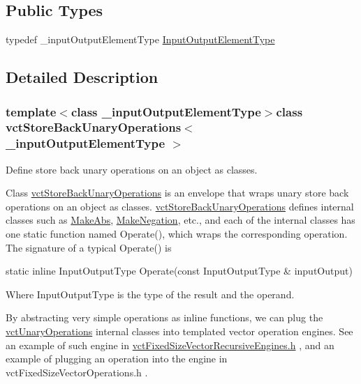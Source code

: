 \subsection*{Public Types}
\begin{DoxyCompactItemize}
\item 
typedef \+\_\+input\+Output\+Element\+Type \hyperlink{classvct_store_back_unary_operations_a8af17faaa73a8d090094d468eee32062}{Input\+Output\+Element\+Type}
\end{DoxyCompactItemize}


\subsection{Detailed Description}
\subsubsection*{template$<$class \+\_\+input\+Output\+Element\+Type$>$class vct\+Store\+Back\+Unary\+Operations$<$ \+\_\+input\+Output\+Element\+Type $>$}

Define store back unary operations on an object as classes. 

Class \hyperlink{classvct_store_back_unary_operations}{vct\+Store\+Back\+Unary\+Operations} is an envelope that wraps unary store back operations on an object as classes. \hyperlink{classvct_store_back_unary_operations}{vct\+Store\+Back\+Unary\+Operations} defines internal classes such as \hyperlink{classvct_store_back_unary_operations_1_1_make_abs}{Make\+Abs}, \hyperlink{classvct_store_back_unary_operations_1_1_make_negation}{Make\+Negation}, etc., and each of the internal classes has one static function named Operate(), which wraps the corresponding operation. The signature of a typical Operate() is


\begin{DoxyPre} static inline InputOutputType Operate(const InputOutputType & inputOutput)
\end{DoxyPre}


Where Input\+Output\+Type is the type of the result and the operand.

By abstracting very simple operations as inline functions, we can plug the \hyperlink{classvct_unary_operations}{vct\+Unary\+Operations} internal classes into templated vector operation engines. See an example of such engine in \hyperlink{vct_fixed_size_vector_recursive_engines_8h}{vct\+Fixed\+Size\+Vector\+Recursive\+Engines.\+h} , and an example of plugging an operation into the engine in vct\+Fixed\+Size\+Vector\+Operations.\+h .


